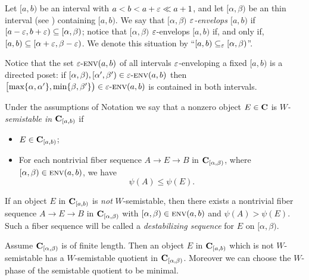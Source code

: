\begin{definition}\label{e.envelops}
Let $[a,b)$ be an interval with $a<b<a+\varepsilon \ll a+1$, and let $[\alpha,\beta)$ be an thin interval (see \adef {}) containing $[a,b)$.
We say that $[\alpha,\beta)$ \emph{$\varepsilon $\hyp{}envelops $[a,b)$} if $[a-\varepsilon ,b+\varepsilon )\subseteq [\alpha,\beta)$; notice that $[\alpha,\beta)$ $\varepsilon $\hyp{}envelops $[a,b)$ if, and only if, $[a,b)\subseteq [\alpha+\varepsilon, \beta-\varepsilon)$. We denote this situation by ``$[a,b)\subseteq_\varepsilon  [\alpha,\beta)$''.
\end{definition}
\begin{remark}\label{is.directed}
Notice that the set $\varepsilon\text{-}\textsc{env}(a,b)$ of all intervals $\varepsilon$\hyp{}enveloping a fixed $[a,b)$ is a directed poset: if $[\alpha,\beta), [\alpha',\beta') \in \varepsilon\text{-}\textsc{env}(a,b)$ then $\big[\text{max}\{\alpha, \alpha'\}, \text{min}\{\beta, \beta'\}\big) \in \varepsilon\text{-}\textsc{env}(a,b)$ is contained in both intervals.
\end{remark}
\begin{definition}\label{w.semistables.in.thin}
Under the assumptions of Notation  we say that a nonzero object $E\in\textbf{C}$ is \emph{$W$\hyp{}semistable in $\textbf{C}_{[a,b)}$} if
\begin{itemize}
\item $E\in \textbf{C}_{[a,b)}$;
\item For each nontrivial fiber sequence $A\to E\to B$ in $\textbf{C}_{[\alpha,\beta)}$, where $[\alpha,\beta)\in\textsc{env}(a,b)$, we have \[\psi(A)\leq \psi(E).\]
\end{itemize}
\end{definition}
\begin{definition}
If an object $E$ in $\textbf{C}_{[a,b)}$ is \emph{not} $W$\hyp{}semistable, then there exists a nontrivial fiber sequence $A\to E\to B$ in $\textbf{C}_{[\alpha,\beta)}$ with $[\alpha,\beta)\in\textsc{env}(a,b)$ and  $\psi(A)> \psi(E)$. Such a fiber sequence will be called a \emph{destabilizing sequence} for $E$ on $[\alpha,\beta)$.
\end{definition}
\begin{proposition}
Assume $\textbf{C}_{[\alpha,\beta)}$ is of finite length. Then an object $E$ in $\textbf{C}_{[a,b)}$ which is not $W$\hyp{}semistable has a $W$\hyp{}semistable quotient in $\textbf{C}_{[\alpha,\beta)}$. Moreover we can choose the $W$\hyp{}phase of the semistable quotient to be minimal.
\end{proposition}
